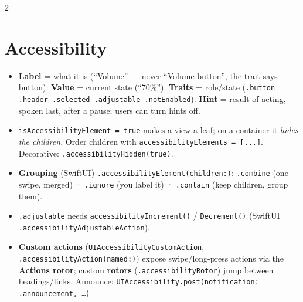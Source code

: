 \documentclass[8pt]{extarticle}
\begin{document}



\begin{multicols}{2}
\raggedright

\section{Accessibility}
\begin{itemize}
  \item \textbf{Label} = what it is (``Volume'' — never ``Volume button'', the
        trait says button). \textbf{Value} = current state (``70\%'').
        \textbf{Traits} = role/state (\texttt{.button .header .selected
        .adjustable .notEnabled}). \textbf{Hint} = result of acting, spoken
        last, after a pause; users can turn hints off.
  \item \texttt{isAccessibilityElement = true} makes a view a leaf;
        on a container it \emph{hides the children}. Order children with
        \texttt{accessibilityElements = [...]}. Decorative:
        \texttt{.accessibilityHidden(true)}.
  \item \textbf{Grouping} (SwiftUI) \texttt{.accessibilityElement(children:)}:
        \texttt{.combine} (one swipe, merged) · \texttt{.ignore} (you label it)
        · \texttt{.contain} (keep children, group them).
  \item \texttt{.adjustable} needs \texttt{accessibilityIncrement()} /
        \texttt{Decrement()} (SwiftUI \texttt{.accessibilityAdjustableAction}).
  \item \textbf{Custom actions} (\texttt{UIAccessibilityCustomAction},
        \texttt{.accessibilityAction(named:)}) expose swipe/long-press
        actions via the \textbf{Actions rotor}; custom \textbf{rotors}
        (\texttt{.accessibilityRotor}) jump between headings/links.
        Announce: \texttt{UIAccessibility.post(notification: .announcement, \ldots)}.

\end{itemize}
\end{multicols}
\end{document}

